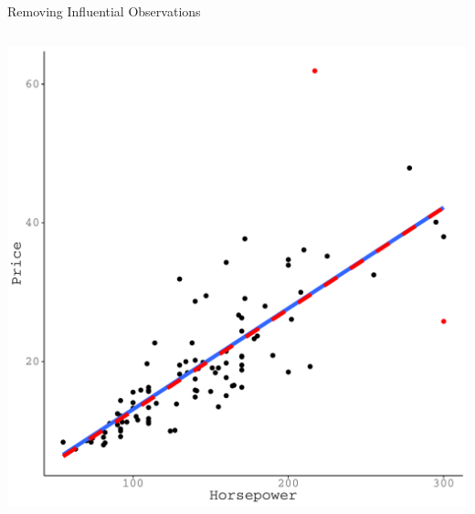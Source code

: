 \documentclass[10pt]{beamer}\usepackage[]{graphicx}\usepackage[]{color}
\makeatletter
\def\maxwidth{ %
  \ifdim\Gin@nat@width>\linewidth
    \linewidth
  \else
    \Gin@nat@width
  \fi
}
\newenvironment{knitrout}{}{} %
\makeatother
\begin{document}
\begin{frame}[fragile]{Removing Influential Observations}
\begin{columns}
\begin{column}{0.5\textwidth}
\begin{knitrout}
{\centering \includegraphics[width=\maxwidth]{figure/assumptions-unnamed-chunk-38-1} 

}


\end{knitrout}

\end{column}
\end{columns}

\end{frame}

\end{document}
